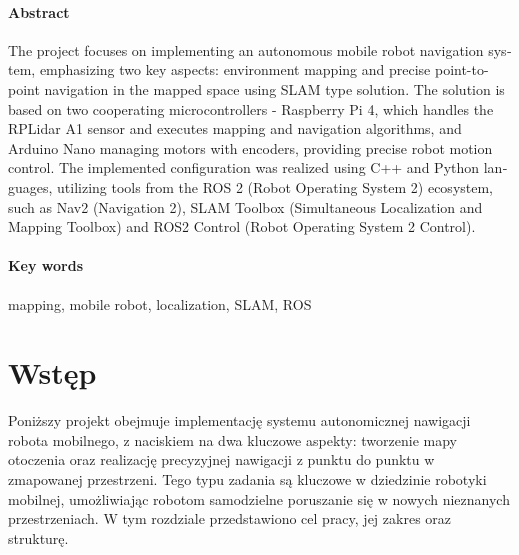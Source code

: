 \documentclass[a4paper,twoside,12pt]{book}
\newcounter{stronyPozaNumeracja}
\begin{document}
\subsubsection*{Abstract} 
\begin{otherlanguage}{british}
The project focuses on implementing an autonomous mobile robot navigation system, emphasizing two key aspects: environment mapping and precise point-to-point navigation in the mapped space using SLAM type solution. The solution is based on two cooperating microcontrollers - Raspberry Pi 4, which handles the RPLidar A1 sensor and executes mapping and navigation algorithms, and Arduino Nano managing motors with encoders, providing precise robot motion control. The implemented configuration was realized using C++ and Python languages, utilizing tools from the ROS 2 (Robot Operating System 2) ecosystem, such as Nav2 (Navigation 2), SLAM Toolbox (Simultaneous Localization and Mapping Toolbox) and ROS2 Control (Robot Operating System 2 Control).

\end{otherlanguage}
\subsubsection*{Key words}  
\begin{otherlanguage}{british}
mapping, mobile robot, localization, SLAM, ROS
\end{otherlanguage}




\tableofcontents

\setcounter{stronyPozaNumeracja}{\value{page}}
\mainmatter
\pagestyle{empty}

\cleardoublepage

\pagestyle{NumeryStronNazwyRozdzialow}


\chapter{Wstęp}
\label{ch:wstep}
Poniższy projekt obejmuje implementację systemu autonomicznej nawigacji robota mobilnego, z naciskiem na dwa kluczowe aspekty: tworzenie mapy otoczenia oraz realizację precyzyjnej nawigacji z punktu do punktu w zmapowanej przestrzeni. Tego typu zadania są kluczowe w dziedzinie robotyki mobilnej, umożliwiając robotom samodzielne poruszanie się w nowych nieznanych przestrzeniach.
W tym rozdziale przedstawiono cel pracy, jej zakres oraz strukturę.
\end{document}
